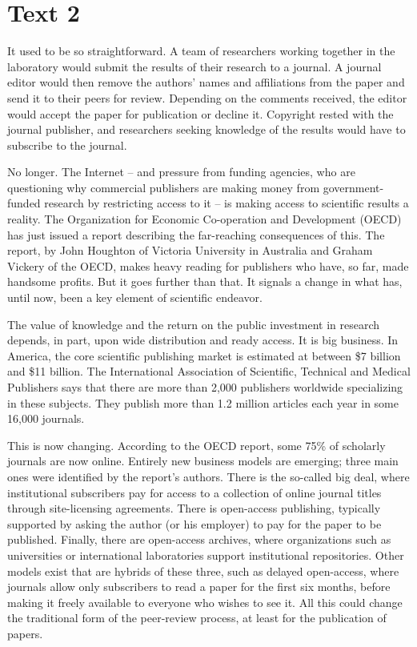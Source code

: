 \documentclass[a4paper]{ctexart}
\begin{document}


\section{Text 2}
It used to be so straightforward. A team of researchers working together in the laboratory would submit the results of their research to a journal. A journal editor would then remove the authors’ names and affiliations from the paper and send it to their peers for review. Depending on the comments received, the editor would accept the paper for publication or decline it. Copyright rested with the journal publisher, and researchers seeking knowledge of the results would have to subscribe to the journal.
\par
No longer. The Internet – and pressure from funding agencies, who are questioning why commercial publishers are making money from government-funded research by restricting access to it – is making access to scientific results a reality. The Organization for Economic Co-operation and Development (OECD) has just issued a report describing the far-reaching consequences of this. The report, by John Houghton of Victoria University in Australia and Graham Vickery of the OECD, makes heavy reading for publishers who have, so far, made handsome profits. But it goes further than that. It signals a change in what has, until now, been a key element of scientific endeavor.
\par
The value of knowledge and the return on the public investment in research depends, in part, upon wide distribution and ready access. It is big business. In America, the core scientific publishing market is estimated at between \$7 billion and \$11 billion. The International Association of Scientific, Technical and Medical Publishers says that there are more than 2,000 publishers worldwide specializing in these subjects. They publish more than 1.2 million articles each year in some 16,000 journals.
\par
This is now changing. According to the OECD report, some 75\% of scholarly journals are now online. Entirely new business models are emerging; three main ones were identified by the report’s authors. There is the so-called big deal, where institutional subscribers pay for access to a collection of online journal titles through site-licensing agreements. There is open-access publishing, typically supported by asking the author (or his employer) to pay for the paper to be published. Finally, there are open-access archives, where organizations such as universities or international laboratories support institutional repositories. Other models exist that are hybrids of these three, such as delayed open-access, where journals allow only subscribers to read a paper for the first six months, before making it freely available to everyone who wishes to see it. All this could change the traditional form of the peer-review process, at least for the publication of papers.
\end{document}

